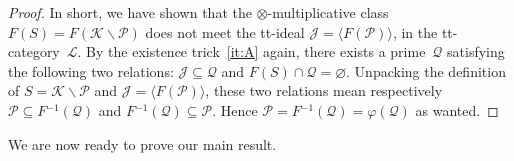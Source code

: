 \documentclass{amsart}
\numberwithin{equation}{section}
\theoremstyle{remark}
\begin{document}
\begin{proof}
In short, we have shown that the $\otimes$-multiplicative class $F(S)=F({\mathscr{{K}}}{\!\smallsetminus\!} {{\mathscr{{P}}}})$ does not meet the tt-ideal ${\mathscr{{J}}}={\langle {F({{\mathscr{{P}}}})}\rangle}$, in the tt-category~${\mathscr{{L}}}$. By the existence trick~\eqref{it:A} again, there exists a prime~${{\mathscr{{Q}}}}$ satisfying the following two relations: ${\mathscr{{J}}}\subseteq {{\mathscr{{Q}}}}$ and $F(S)\cap {{\mathscr{{Q}}}}=\varnothing$. Unpacking the definition of $S={\mathscr{{K}}}{\!\smallsetminus\!}{{\mathscr{{P}}}}$ and ${\mathscr{{J}}}={\langle {F({{\mathscr{{P}}}})}\rangle}$, these two relations mean respectively ${{\mathscr{{P}}}}\subseteq F{^{-1}}({{\mathscr{{Q}}}})$ and $F{^{-1}}({{\mathscr{{Q}}}})\subseteq {{\mathscr{{P}}}}$. Hence ${{\mathscr{{P}}}}=F{^{-1}}({{\mathscr{{Q}}}})=\varphi({{\mathscr{{Q}}}})$ as wanted.
\end{proof}

We are now ready to prove our main result.
\end{document}

